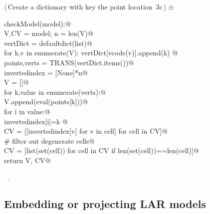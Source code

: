 \documentclass[11pt,oneside]{article}	%
\begin{document}
\begin{flushleft} \small \label{scrap4}
\protect{}$\langle\,$Create a dictionary with key the point location\nobreak\ {\footnotesize 3c}$\,\rangle\equiv$
\vspace{-1ex}
\begin{list}{}{} \item
\mbox{}\verb@def checkModel(model):@\\
\mbox{}\verb@   V,CV = model; n = len(V)@\\
\mbox{}\verb@   vertDict = defaultdict(list)@\\
\mbox{}\verb@   for k,v in enumerate(V): vertDict[vcode(v)].append(k) @\\
\mbox{}\verb@   points,verts = TRANS(vertDict.items())@\\
\mbox{}\verb@   invertedindex = [None]*n@\\
\mbox{}\verb@   V = []@\\
\mbox{}\verb@   for k,value in enumerate(verts):@\\
\mbox{}\verb@      V.append(eval(points[k]))@\\
\mbox{}\verb@      for i in value:@\\
\mbox{}\verb@         invertedindex[i]=k   @\\
\mbox{}\verb@   CV = [[invertedindex[v] for v in cell] for cell in CV]@\\
\mbox{}\verb@   # filter out degenerate cells@\\
\mbox{}\verb@   CV = [list(set(cell)) for cell in CV if len(set(cell))==len(cell)]@\\
\mbox{}\verb@   return V, CV@\\
\mbox{}\verb@@{\NWsep}
\end{list}
\vspace{-1ex}
\footnotesize\addtolength{\baselineskip}{-1ex}
\begin{list}{}{\setlength{\itemsep}{-\parsep}\setlength{\itemindent}{-\leftmargin}}
\item \NWtxtMacroRefIn\ .
\end{list}
\end{flushleft}

\subsection{Embedding or projecting LAR models}
\end{document}
